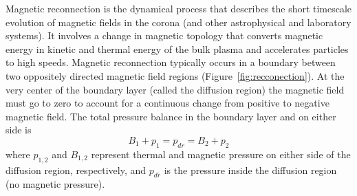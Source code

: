 Magnetic reconnection is the dynamical process that describes the short timescale evolution of magnetic fields in the corona (and other astrophysical and laboratory systems). It involves a change in magnetic topology that converts magnetic energy in kinetic and thermal energy of the bulk plasma and accelerates particles to high speeds. Magnetic reconnection typically occurs in a boundary between two oppositely directed magnetic field regions (Figure~\ref{fig:recconection}). At the very center of the boundary layer (called the diffusion region) the magnetic field must go to zero to account for a continuous change from positive to negative magnetic field. The total pressure balance in the boundary layer and on either side is \citep{asch2004}
\begin{equation}
B_1 + p_1 = p_{dr} = B_2 + p_2
\end{equation}
where $p_{1,2}$ and $B_{1,2}$ represent thermal and magnetic pressure on either side of the diffusion region, respectively, and $p_{dr}$ is the pressure inside the diffusion region (no magnetic pressure).



